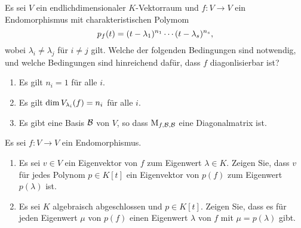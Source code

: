 \documentclass[a4paper, 10pt]{scrartcl}
\begin{document}





\begin{question}
  Es sei $V$ ein endlichdimensionaler $K$-Vektorraum und $f \colon V \to V$ ein Endomorphismus mit charakteristischen Polymom
  \[
      \charpol{f}(t)
    = (t - \lambda_1)^{n_1} \dotsm (t - \lambda_s)^{n_s},
  \]
  wobei $\lambda_i \neq \lambda_j$ für $i \neq j$ gilt.
  Welche der folgenden Bedingungen sind notwendig, und welche Bedingungen sind hinreichend dafür, dass $f$ diagonlisierbar ist?
  \begin{enumerate}
    \item
      Es gilt $n_i = 1$ für alle $i$.
    \item
      Es gilt $\dim \eigenspace{V}{f}{\lambda_i} = n_i$ für alle $i$.
    \item
      Es gibt eine Basis $\basis{B}$ von $V$, so dass $\repmatrixendo{f}{\basis{B}}$ eine Diagonalmatrix ist.
  \end{enumerate}
\end{question}





\begin{question}
  Es sei $f \colon V \to V$ ein Endomorphismus.
  \begin{enumerate}
    \item
      Es sei $v \in V$ ein Eigenvektor von $f$ zum Eigenwert $\lambda \in K$.
      Zeigen Sie, dass $v$ für jedes Polynom $p \in K[t]$ ein Eigenvektor von $p(f)$ zum Eigenwert $p(\lambda)$ ist.
    \item
      Es sei $K$ algebraisch abgeschlossen und $p \in K[t]$.
      Zeigen Sie, dass es für jeden Eigenwert $\mu$ von $p(f)$ einen Eigenwert $\lambda$ von $f$ mit $\mu = p(\lambda)$ gibt.
  \end{enumerate}
\end{question}
\end{document}

